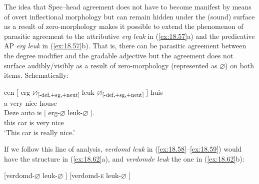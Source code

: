 \documentclass[output=paper]{langsci/langscibook}
\begin{document}
The idea that Spec--head agreement does not have to become manifest by means of
overt inflectional morphology but can remain hidden under the (sound) surface
as a result of zero-morphology makes it possible to extend the phenomenon of
parasitic agreement to the attributive \emph{erg leuk} in (\ref{ex:18.57}a) and
the predicative AP \emph{erg leuk} in (\ref{ex:18.57}b). That is, there can be
parasitic agreement between the degree modifier and the gradable adjective but
the agreement does not surface audibly/visibly as a result of zero-morphology
(represented as ${\varnothing}$) on both items. Schematically:

\ea%
    \label{ex:18.61}
	\ea
	\gll een [ erg-${\varnothing}$\textsubscript{[-def,+sg,+neut]} leuk-${\varnothing}$\textsubscript{[-def,+sg,+neut]} ] huis\\
    a   {}     very                        nice                         {}     house\\
	\ex
	\gll Deze  auto    is  [ erg-${\varnothing}$    leuk-${\varnothing}$ ].\\
        this    car      is {} very        nice {}\\
	\glt \enquote*{This car is really nice.}
	\z
\z

If we follow this line of analysis, \emph{verdomd leuk} in
(\ref{ex:18.58}--\ref{ex:18.59}) would have the structure in
(\ref{ex:18.62}a), and \emph{verdomde leuk} the one in (\ref{ex:18.62}b):

\ea%
    \label{ex:18.62}
    \ea {}[verdomd-${\varnothing}$  leuk-${\varnothing}$ ]
	\ex {}[verdomd-\textsc{e}    leuk-${\varnothing}$ ]
	\z
\z
\end{document}
